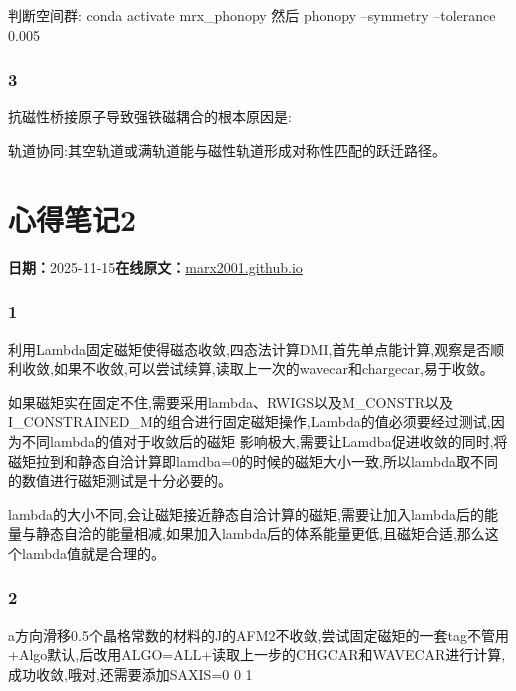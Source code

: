 \documentclass[lang=cn,scheme=chinese,color=blue,device=normal,toc=onecol,math=cm]{elegantbook}
\begin{document}
判断空间群: conda activate mrx\_\allowbreak{}phonopy 然后 phonopy –symmetry –tolerance 0.005\par


\subsubsection{3}


抗磁性桥接原子导致强铁磁耦合的根本原因是:\par


轨道协同:其空轨道或满轨道能与磁性轨道形成对称性匹配的跃迁路径。\par



\section{心得笔记2}
\begin{articlemeta}
\textbf{日期：}2025-11-15\hfill\textbf{在线原文：}\href{https://marx2001.github.io/sci-note\_posts/20251115-h}{marx2001.github.io}
\end{articlemeta}

\subsubsection{1}


利用Lambda固定磁矩使得磁态收敛,四态法计算DMI,首先单点能计算,观察是否顺利收敛,如果不收敛,可以尝试续算,读取上一次的wavecar和chargecar,易于收敛。\par


如果磁矩实在固定不住,需要采用lambda、RWIGS以及M\_\allowbreak{}CONSTR以及I\_\allowbreak{}CONSTRAINED\_\allowbreak{}M的组合进行固定磁矩操作,Lambda的值必须要经过测试,因为不同lambda的值对于收敛后的磁矩 影响极大,需要让Lamdba促进收敛的同时,将磁矩拉到和静态自洽计算即lamdba=0的时候的磁矩大小一致,所以lambda取不同的数值进行磁矩测试是十分必要的。\par


lambda的大小不同,会让磁矩接近静态自洽计算的磁矩,需要让加入lambda后的能量与静态自洽的能量相减,如果加入lambda后的体系能量更低,且磁矩合适,那么这个lambda值就是合理的。\par


\subsubsection{2}


a方向滑移0.5个晶格常数的材料的J的AFM2不收敛,尝试固定磁矩的一套tag不管用+Algo默认,后改用ALGO=ALL+读取上一步的CHGCAR和WAVECAR进行计算,成功收敛,哦对,还需要添加SAXIS=0 0 1\par
\end{document}
